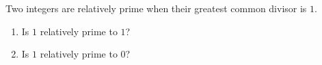 Two integers are relatively prime when their greatest common divisor is $1$.
\begin{enumerate}
\item[(a)] Is $1$ relatively prime to $1$?
\item[(b)] Is $1$ relatively prime to $0$?
\end{enumerate}
